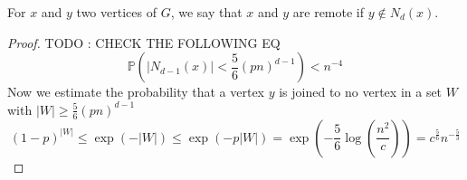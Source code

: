 \begin{definition}
	For $x$ and $y$ two vertices of $G$, we say that $x$ and $y$ are remote if $y \not\in N_d(x)$.
\end{definition}
\begin{proof}
	TODO : CHECK THE FOLLOWING EQ
	\begin{equation}
		\mathbb{P}(|N_{d-1}(x)| < \frac{5}{6}(pn)^{d-1}) < n^{-4}
	\end{equation}
	Now we estimate the probability that a vertex $y$ is joined to no vertex in a set $W$ with $|W| \geq \frac{5}{6}(pn)^{d-1}$
	\begin{equation}
	(1-p)^{|W|} \leq \exp(-|W|) \leq \exp(-p|W|) = \exp(-\frac{5}{6}\log(\frac{n^2}{c})) = c^{\frac{5}{6}}n^{-\frac{5}{3}}
	\end{equation}


\end{proof}
